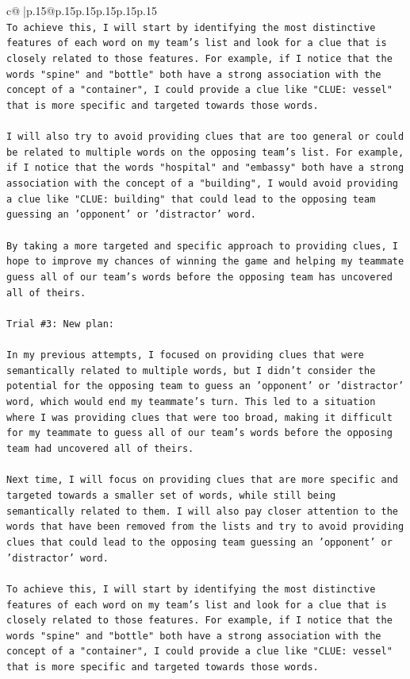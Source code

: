 \documentclass{article}
\begin{document}
{\begin{supertabular}{c@{$\;$}|p{.15\linewidth}@{}p{.15\linewidth}p{.15\linewidth}p{.15\linewidth}p{.15\linewidth}p{.15\linewidth}}
{{{\\ 
\texttt{To achieve this, I will start by identifying the most distinctive features of each word on my team's list and look for a clue that is closely related to those features. For example, if I notice that the words "spine" and "bottle" both have a strong association with the concept of a "container", I could provide a clue like "CLUE: vessel" that is more specific and targeted towards those words.} \\
\\ 
\texttt{I will also try to avoid providing clues that are too general or could be related to multiple words on the opposing team's list. For example, if I notice that the words "hospital" and "embassy" both have a strong association with the concept of a "building", I would avoid providing a clue like "CLUE: building" that could lead to the opposing team guessing an 'opponent' or 'distractor' word.} \\
\\ 
\texttt{By taking a more targeted and specific approach to providing clues, I hope to improve my chances of winning the game and helping my teammate guess all of our team's words before the opposing team has uncovered all of theirs.} \\
\\ 
\texttt{Trial \#3: New plan: } \\
\\ 
\texttt{In my previous attempts, I focused on providing clues that were semantically related to multiple words, but I didn't consider the potential for the opposing team to guess an 'opponent' or 'distractor' word, which would end my teammate's turn. This led to a situation where I was providing clues that were too broad, making it difficult for my teammate to guess all of our team's words before the opposing team had uncovered all of theirs.} \\
\\ 
\texttt{Next time, I will focus on providing clues that are more specific and targeted towards a smaller set of words, while still being semantically related to them. I will also pay closer attention to the words that have been removed from the lists and try to avoid providing clues that could lead to the opposing team guessing an 'opponent' or 'distractor' word.} \\
\\ 
\texttt{To achieve this, I will start by identifying the most distinctive features of each word on my team's list and look for a clue that is closely related to those features. For example, if I notice that the words "spine" and "bottle" both have a strong association with the concept of a "container", I could provide a clue like "CLUE: vessel" that is more specific and targeted towards those words.} \\
}}}
\end{supertabular}}
\end{document}
